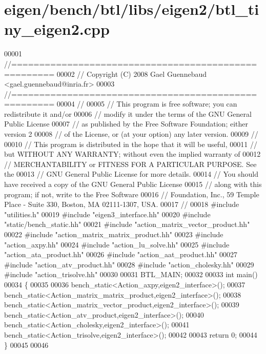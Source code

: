 \hypertarget{eigen_2bench_2btl_2libs_2eigen2_2btl__tiny__eigen2_8cpp_source}{}\section{eigen/bench/btl/libs/eigen2/btl\+\_\+tiny\+\_\+eigen2.cpp}
\label{eigen_2bench_2btl_2libs_2eigen2_2btl__tiny__eigen2_8cpp_source}

\begin{DoxyCode}
00001 \textcolor{comment}{//=====================================================}
00002 \textcolor{comment}{// Copyright (C) 2008 Gael Guennebaud <gael.guennebaud@inria.fr>}
00003 \textcolor{comment}{//=====================================================}
00004 \textcolor{comment}{//}
00005 \textcolor{comment}{// This program is free software; you can redistribute it and/or}
00006 \textcolor{comment}{// modify it under the terms of the GNU General Public License}
00007 \textcolor{comment}{// as published by the Free Software Foundation; either version 2}
00008 \textcolor{comment}{// of the License, or (at your option) any later version.}
00009 \textcolor{comment}{//}
00010 \textcolor{comment}{// This program is distributed in the hope that it will be useful,}
00011 \textcolor{comment}{// but WITHOUT ANY WARRANTY; without even the implied warranty of}
00012 \textcolor{comment}{// MERCHANTABILITY or FITNESS FOR A PARTICULAR PURPOSE.  See the}
00013 \textcolor{comment}{// GNU General Public License for more details.}
00014 \textcolor{comment}{// You should have received a copy of the GNU General Public License}
00015 \textcolor{comment}{// along with this program; if not, write to the Free Software}
00016 \textcolor{comment}{// Foundation, Inc., 59 Temple Place - Suite 330, Boston, MA  02111-1307, USA.}
00017 \textcolor{comment}{//}
00018 \textcolor{preprocessor}{#include "utilities.h"}
00019 \textcolor{preprocessor}{#include "eigen3\_interface.hh"}
00020 \textcolor{preprocessor}{#include "static/bench\_static.hh"}
00021 \textcolor{preprocessor}{#include "action\_matrix\_vector\_product.hh"}
00022 \textcolor{preprocessor}{#include "action\_matrix\_matrix\_product.hh"}
00023 \textcolor{preprocessor}{#include "action\_axpy.hh"}
00024 \textcolor{preprocessor}{#include "action\_lu\_solve.hh"}
00025 \textcolor{preprocessor}{#include "action\_ata\_product.hh"}
00026 \textcolor{preprocessor}{#include "action\_aat\_product.hh"}
00027 \textcolor{preprocessor}{#include "action\_atv\_product.hh"}
00028 \textcolor{preprocessor}{#include "action\_cholesky.hh"}
00029 \textcolor{preprocessor}{#include "action\_trisolve.hh"}
00030 
00031 BTL\_MAIN;
00032 
00033 \textcolor{keywordtype}{int} main()
00034 \{
00035 
00036   bench\_static<Action\_axpy,eigen2\_interface>();
00037   bench\_static<Action\_matrix\_matrix\_product,eigen2\_interface>();
00038   bench\_static<Action\_matrix\_vector\_product,eigen2\_interface>();
00039   bench\_static<Action\_atv\_product,eigen2\_interface>();
00040   bench\_static<Action\_cholesky,eigen2\_interface>();
00041   bench\_static<Action\_trisolve,eigen2\_interface>();
00042 
00043   \textcolor{keywordflow}{return} 0;
00044 \}
00045 
00046 
\end{DoxyCode}
